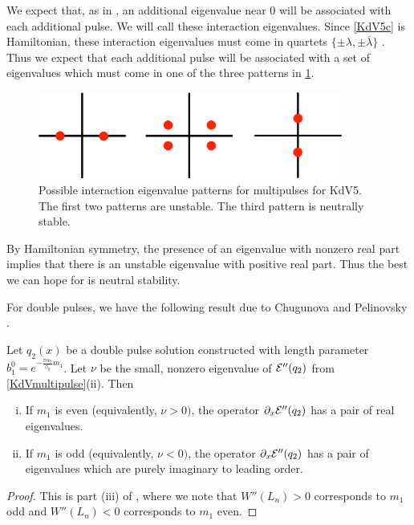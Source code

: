 \documentclass[thesis.tex]{subfiles}
\begin{document}
We expect that, as in \cite{Sandstede1998}, an additional eigenvalue near 0 will be associated with each additional pulse. We will call these interaction eigenvalues. Since \cref{KdV5c} is Hamiltonian, these interaction eigenvalues must come in quartets $\{ \pm \lambda, \pm \overline{\lambda}\}$ \cite[Proposition 5.1.2]{Kapitula2013}. Thus we expect that each additional pulse will be associated with a set of eigenvalues which must come in one of the three patterns in \cref{fig:kdv5inteigpattern}.

\begin{figure}[H]
\includegraphics[width=10cm]{images/kdv5/eigdouble2}
\caption{Possible interaction eigenvalue patterns for multipulses for KdV5. The first two patterns are unstable. The third pattern is neutrally stable.}
\label{fig:kdv5inteigpattern}
\end{figure}

By Hamiltonian symmetry, the presence of an eigenvalue with nonzero real part implies that there is an unstable eigenvalue with positive real part. Thus the best we can hope for is neutral stability.

For double pulses, we have the following result due to Chugunova and Pelinovsky \cite{Pelinovsky2007}.

\begin{theorem}\label{KdV5doubleeigs}
Let $q_2(x)$ be a double pulse solution constructed with length parameter $b_1^0 = e^{-\frac{\pi \alpha_0}{\beta_0}m_1}$. Let $\nu$ be the small, nonzero eigenvalue of $\mathcal{E}''(q_2)$ from \cref{KdVmultipulse}(ii).
Then
\begin{enumerate}[(i)]
	\item If $m_1$ is even (equivalently, $\nu > 0)$, the operator $\partial_x \mathcal{E}''(q_2)$ has a pair of real eigenvalues.
	\item If $m_1$ is odd (equivalently, $\nu < 0)$, the operator $\partial_x \mathcal{E}''(q_2)$ has a pair of eigenvalues which are purely imaginary to leading order.
\end{enumerate}
\begin{proof}
This is part (iii) of \cite[Theorem 2.3]{Pelinovsky2007}, where we note that $W''(L_n) > 0$ corresponds to $m_1$ odd and $W''(L_n) < 0$ corresponds to $m_1$ even.
\end{proof}
\end{theorem}

\iffulldocument\else
	
	
\fi
\end{document}
